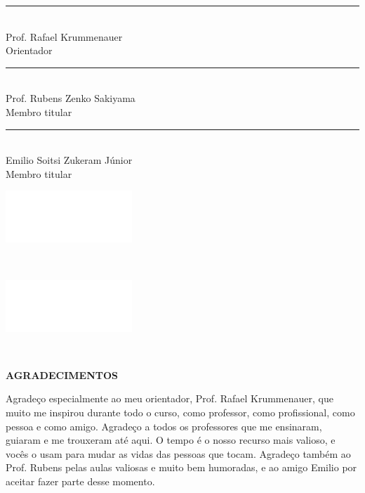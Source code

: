\documentclass[12pt,a4paper]{report}
\begin{document}
\rule [0cm]{10cm}{0.1pt}\\
Prof. Rafael Krummenauer\\
Orientador\\[2.41cm]

\rule [0cm]{10cm}{0.1pt}\\
Prof. Rubens Zenko Sakiyama\\
Membro titular\\[2.41cm]

\rule [0cm]{10cm}{0.1pt}\\
Emilio Soitsi Zukeram Júnior\\
Membro titular\\[2.41cm]

\thispagestyle{empty}
\clearpage

\begin{minipage}{0.9\linewidth}
  \includegraphics[scale=0.01]{images/branco} 
\end{minipage}\\[21cm]

\begin{minipage}{0.59\linewidth}
  \includegraphics[scale=0.01]{images/branco} 
\end{minipage}
\begin{minipage}{0.4\linewidth}

\end{minipage}\\[18cm]


\thispagestyle{empty}
\clearpage

{
  \center \Large \bf AGRADECIMENTOS
}\\[1cm]

\justifying

Agradeço especialmente ao meu orientador, Prof. Rafael Krummenauer, que muito me inspirou durante todo o curso,
como professor, como profissional, como pessoa e como amigo. Agradeço a todos os professores que me ensinaram,
guiaram e me trouxeram até aqui. O tempo é o nosso recurso mais valioso, e vocês o usam para mudar as vidas
das pessoas que tocam. Agradeço também ao Prof. Rubens pelas aulas valiosas e muito bem humoradas, e ao amigo
Emilio por aceitar fazer parte desse momento.
\end{document}

